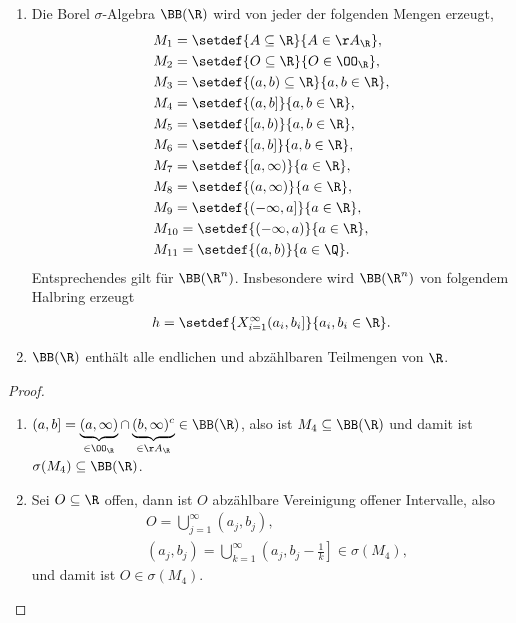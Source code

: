 \begin{prop}
\label{prop:3.6}
\begin{enumerate}[label=\arabic{*}.)]
  \item Die Borel $\sigma$-Algebra $\BB(\R)$ wird von jeder der folgenden Mengen
erzeugt,
\begin{align*}
&M_1 = \setdef{A\subseteq\R}{A\in\AA_\R},\\
&M_2 = \setdef{O\subseteq\R}{O\in\OO_\R},\\
&M_3 = \setdef{(a,b)\subseteq\R}{a,b\in\R},\\
&M_4 = \setdef{(a,b]}{a,b\in\R},\\
&M_5 = \setdef{[a,b)}{a,b\in\R},\\
&M_6 = \setdef{[a,b]}{a,b\in\R},\\
&M_7 = \setdef{[a,\infty)}{a\in\R},\\
&M_8 = \setdef{(a,\infty)}{a\in\R},\\
&M_9 = \setdef{(-\infty,a]}{a\in\R},\\
&M_{10} = \setdef{(-\infty,a)}{a\in\R},\\
&M_{11} = \setdef{(a,b)}{a\in\Q}.
\end{align*}
Entsprechendes gilt für $\BB(\R^n)$. Insbesondere wird $\BB(\R^n)$ von
folgendem Halbring erzeugt
\begin{align*}
h = \setdef{X_{i=1}^\infty (a_i,b_i]}{a_i,b_i\in\R}.
\end{align*}
\item
$\BB(\R)$ enthält alle endlichen und abzählbaren Teilmengen von $\R$.\fishhere
\end{enumerate}
\end{prop}

\begin{proof}
\begin{enumerate}[label=\arabic{*}.)]
  \item $(a,b] = \underbrace{(a,\infty)}_{\in\OO_\R}\cap
  \underbrace{(b,\infty)^c}_{\in\AA_\R} \in\BB(\R)$, also ist
  $M_4\subseteq\BB(\R)$ und damit ist $\sigma(M_4)\subseteq \BB(\R)$.
  \item Sei $O\subseteq\R$ offen, dann ist $O$ abzählbare Vereinigung offener
  Intervalle, also
  \begin{align*}
  &O = \bigcup_{j=1}^\infty (a_j,b_j),\\
  &(a_j,b_j) = \bigcup_{k=1}^\infty \left(a_j,b_j -
  \frac{1}{k}\right]\in\sigma(M_4),
  \end{align*}
und damit ist $O\in\sigma(M_4)$.\qedhere
\end{enumerate}
\end{proof}

